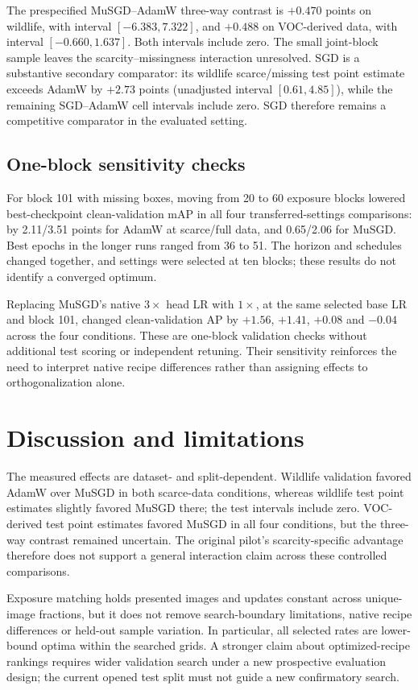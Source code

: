 \documentclass[11pt,a4paper]{article}
\begin{document}
The prespecified MuSGD--AdamW three-way contrast is $+0.470$ points on wildlife, with interval $[-6.383,7.322]$, and $+0.488$ on VOC-derived data, with interval $[-0.660,1.637]$. Both intervals include zero. The small joint-block sample leaves the scarcity--missingness interaction unresolved. SGD is a substantive secondary comparator: its wildlife scarce/missing test point estimate exceeds AdamW by $+2.73$ points (unadjusted interval $[0.61,4.85]$), while the remaining SGD--AdamW cell intervals include zero. SGD therefore remains a competitive comparator in the evaluated setting.

\subsection{One-block sensitivity checks}
For block 101 with missing boxes, moving from 20 to 60 exposure blocks lowered best-checkpoint clean-validation mAP in all four transferred-settings comparisons: by 2.11/3.51 points for AdamW at scarce/full data, and 0.65/2.06 for MuSGD. Best epochs in the longer runs ranged from 36 to 51. The horizon and schedules changed together, and settings were selected at ten blocks; these results do not identify a converged optimum.

Replacing MuSGD's native $3\times$ head LR with $1\times$, at the same selected base LR and block 101, changed clean-validation AP by $+1.56$, $+1.41$, $+0.08$ and $-0.04$ across the four conditions. These are one-block validation checks without additional test scoring or independent retuning. Their sensitivity reinforces the need to interpret native recipe differences rather than assigning effects to orthogonalization alone.

\section{Discussion and limitations}
The measured effects are dataset- and split-dependent. Wildlife validation favored AdamW over MuSGD in both scarce-data conditions, whereas wildlife test point estimates slightly favored MuSGD there; the test intervals include zero. VOC-derived test point estimates favored MuSGD in all four conditions, but the three-way contrast remained uncertain. The original pilot's scarcity-specific advantage therefore does not support a general interaction claim across these controlled comparisons.

Exposure matching holds presented images and updates constant across unique-image fractions, but it does not remove search-boundary limitations, native recipe differences or held-out sample variation. In particular, all selected rates are lower-bound optima within the searched grids. A stronger claim about optimized-recipe rankings requires wider validation search under a new prospective evaluation design; the current opened test split must not guide a new confirmatory search.
\end{document}

